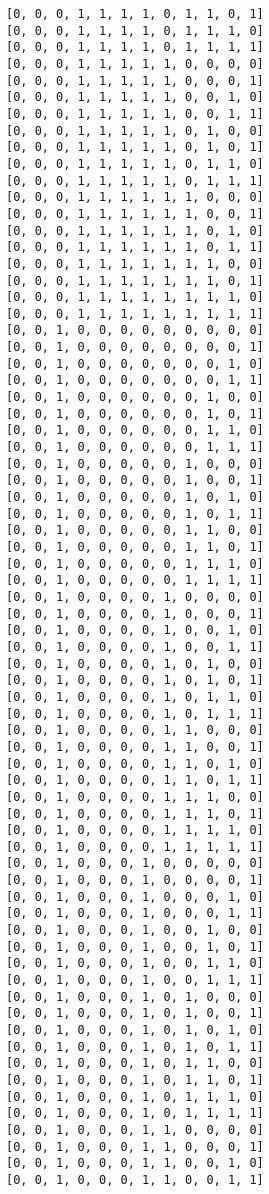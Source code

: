 \documentclass[11pt]{article}
\begin{document}
\begin{Verbatim}[commandchars=\\\{\}]
[0, 0, 0, 1, 1, 1, 1, 0, 1, 1, 0, 1]
[0, 0, 0, 1, 1, 1, 1, 0, 1, 1, 1, 0]
[0, 0, 0, 1, 1, 1, 1, 0, 1, 1, 1, 1]
[0, 0, 0, 1, 1, 1, 1, 1, 0, 0, 0, 0]
[0, 0, 0, 1, 1, 1, 1, 1, 0, 0, 0, 1]
[0, 0, 0, 1, 1, 1, 1, 1, 0, 0, 1, 0]
[0, 0, 0, 1, 1, 1, 1, 1, 0, 0, 1, 1]
[0, 0, 0, 1, 1, 1, 1, 1, 0, 1, 0, 0]
[0, 0, 0, 1, 1, 1, 1, 1, 0, 1, 0, 1]
[0, 0, 0, 1, 1, 1, 1, 1, 0, 1, 1, 0]
[0, 0, 0, 1, 1, 1, 1, 1, 0, 1, 1, 1]
[0, 0, 0, 1, 1, 1, 1, 1, 1, 0, 0, 0]
[0, 0, 0, 1, 1, 1, 1, 1, 1, 0, 0, 1]
[0, 0, 0, 1, 1, 1, 1, 1, 1, 0, 1, 0]
[0, 0, 0, 1, 1, 1, 1, 1, 1, 0, 1, 1]
[0, 0, 0, 1, 1, 1, 1, 1, 1, 1, 0, 0]
[0, 0, 0, 1, 1, 1, 1, 1, 1, 1, 0, 1]
[0, 0, 0, 1, 1, 1, 1, 1, 1, 1, 1, 0]
[0, 0, 0, 1, 1, 1, 1, 1, 1, 1, 1, 1]
[0, 0, 1, 0, 0, 0, 0, 0, 0, 0, 0, 0]
[0, 0, 1, 0, 0, 0, 0, 0, 0, 0, 0, 1]
[0, 0, 1, 0, 0, 0, 0, 0, 0, 0, 1, 0]
[0, 0, 1, 0, 0, 0, 0, 0, 0, 0, 1, 1]
[0, 0, 1, 0, 0, 0, 0, 0, 0, 1, 0, 0]
[0, 0, 1, 0, 0, 0, 0, 0, 0, 1, 0, 1]
[0, 0, 1, 0, 0, 0, 0, 0, 0, 1, 1, 0]
[0, 0, 1, 0, 0, 0, 0, 0, 0, 1, 1, 1]
[0, 0, 1, 0, 0, 0, 0, 0, 1, 0, 0, 0]
[0, 0, 1, 0, 0, 0, 0, 0, 1, 0, 0, 1]
[0, 0, 1, 0, 0, 0, 0, 0, 1, 0, 1, 0]
[0, 0, 1, 0, 0, 0, 0, 0, 1, 0, 1, 1]
[0, 0, 1, 0, 0, 0, 0, 0, 1, 1, 0, 0]
[0, 0, 1, 0, 0, 0, 0, 0, 1, 1, 0, 1]
[0, 0, 1, 0, 0, 0, 0, 0, 1, 1, 1, 0]
[0, 0, 1, 0, 0, 0, 0, 0, 1, 1, 1, 1]
[0, 0, 1, 0, 0, 0, 0, 1, 0, 0, 0, 0]
[0, 0, 1, 0, 0, 0, 0, 1, 0, 0, 0, 1]
[0, 0, 1, 0, 0, 0, 0, 1, 0, 0, 1, 0]
[0, 0, 1, 0, 0, 0, 0, 1, 0, 0, 1, 1]
[0, 0, 1, 0, 0, 0, 0, 1, 0, 1, 0, 0]
[0, 0, 1, 0, 0, 0, 0, 1, 0, 1, 0, 1]
[0, 0, 1, 0, 0, 0, 0, 1, 0, 1, 1, 0]
[0, 0, 1, 0, 0, 0, 0, 1, 0, 1, 1, 1]
[0, 0, 1, 0, 0, 0, 0, 1, 1, 0, 0, 0]
[0, 0, 1, 0, 0, 0, 0, 1, 1, 0, 0, 1]
[0, 0, 1, 0, 0, 0, 0, 1, 1, 0, 1, 0]
[0, 0, 1, 0, 0, 0, 0, 1, 1, 0, 1, 1]
[0, 0, 1, 0, 0, 0, 0, 1, 1, 1, 0, 0]
[0, 0, 1, 0, 0, 0, 0, 1, 1, 1, 0, 1]
[0, 0, 1, 0, 0, 0, 0, 1, 1, 1, 1, 0]
[0, 0, 1, 0, 0, 0, 0, 1, 1, 1, 1, 1]
[0, 0, 1, 0, 0, 0, 1, 0, 0, 0, 0, 0]
[0, 0, 1, 0, 0, 0, 1, 0, 0, 0, 0, 1]
[0, 0, 1, 0, 0, 0, 1, 0, 0, 0, 1, 0]
[0, 0, 1, 0, 0, 0, 1, 0, 0, 0, 1, 1]
[0, 0, 1, 0, 0, 0, 1, 0, 0, 1, 0, 0]
[0, 0, 1, 0, 0, 0, 1, 0, 0, 1, 0, 1]
[0, 0, 1, 0, 0, 0, 1, 0, 0, 1, 1, 0]
[0, 0, 1, 0, 0, 0, 1, 0, 0, 1, 1, 1]
[0, 0, 1, 0, 0, 0, 1, 0, 1, 0, 0, 0]
[0, 0, 1, 0, 0, 0, 1, 0, 1, 0, 0, 1]
[0, 0, 1, 0, 0, 0, 1, 0, 1, 0, 1, 0]
[0, 0, 1, 0, 0, 0, 1, 0, 1, 0, 1, 1]
[0, 0, 1, 0, 0, 0, 1, 0, 1, 1, 0, 0]
[0, 0, 1, 0, 0, 0, 1, 0, 1, 1, 0, 1]
[0, 0, 1, 0, 0, 0, 1, 0, 1, 1, 1, 0]
[0, 0, 1, 0, 0, 0, 1, 0, 1, 1, 1, 1]
[0, 0, 1, 0, 0, 0, 1, 1, 0, 0, 0, 0]
[0, 0, 1, 0, 0, 0, 1, 1, 0, 0, 0, 1]
[0, 0, 1, 0, 0, 0, 1, 1, 0, 0, 1, 0]
[0, 0, 1, 0, 0, 0, 1, 1, 0, 0, 1, 1]

\end{Verbatim}
\end{document}
